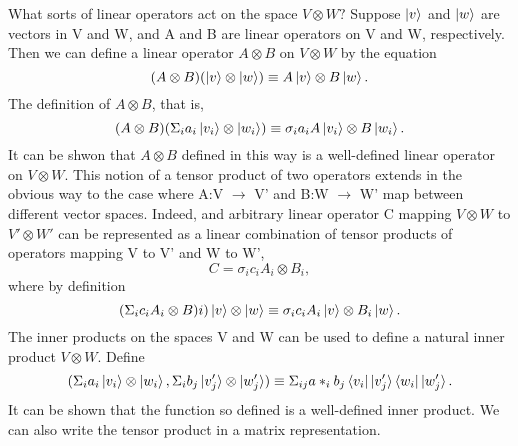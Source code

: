 \documentclass[preprint, 5p, 10pt]{elsarticle}
\theoremstyle{plain}
\begin{document}
  What sorts of linear operators act on the space $V \otimes W?$ Suppose $\ket{v}$ and $\ket{w}$ 
are vectors in V and W, and A and B are linear operators on V and W, respectively. Then we can define
a linear operator $A \otimes B$ on $V \otimes W$ by the equation
\begin{equation}
 (A \otimes B)(\ket{v} \otimes \ket{w}) \equiv A\ket{v} \otimes B\ket{w}.
\end{equation}
The definition of $A \otimes B$, that is,
\begin{equation}
 (A \otimes B)(\Sigma_{i}a_{i}\ket{v_{i}} \otimes \ket{w_{i}}) \equiv \sigma_{i}a_{i}A\ket{v_{i}} \otimes
B\ket{w_{i}}.
\end{equation}
It can be shwon that $A \otimes B$ defined in this way is a well-defined linear operator on $V \otimes W$.
This notion of a tensor product of two operators extends in the obvious way to the case where
A:V $\rightarrow$ V' and B:W $\rightarrow$ W' map between different vector spaces. 
Indeed, and arbitrary linear operator C mapping $V \otimes W$ to $V' \otimes W'$ can be represented
as a linear combination of tensor products of operators mapping V to V' and W to W',
\begin{equation}
 C = \sigma_{i} c_{i}A_{i} \otimes B_{i},
\end{equation}
where by definition
\begin{equation}
 (\Sigma_{i} c_{i}A_{i}\otimes B){i})\ket{v} \otimes \ket{w} \equiv \sigma_{i} c_{i}A_{i}\ket{v} \otimes
B_{i}\ket{w}. 
\end{equation}
  The inner products on the spaces V and W can be used to define a natural inner product $V \otimes W$.
Define
\begin{equation}
 (\Sigma_{i}a_{i}\ket{v_{i}}\otimes \ket{w_{i}},\Sigma_{i} b_{j}\ket{v'_{j}}\otimes \ket{w'_{j}}) \equiv
\Sigma_{ij} a*_{i}b_{j}\bra{v_{i}}\ket{v'_{j}}\bra{w_{i}}\ket{w'_{j}}.
\end{equation}
It can be shown that the function so defined is a well-defined inner product. 
We can also write the tensor product in a matrix representation.
\end{document}
